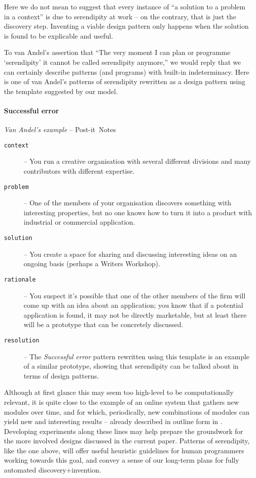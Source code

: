 Here we do not mean to suggest that every instance of ``a solution to a
problem in a context'' is due to serendipity at work -- on the
contrary, that is just the discovery step.  Inventing a viable design pattern
only happens when the solution is found to be explicable and useful.

To van Andel's assertion that ``The very moment I can plan or
programme `serendipity' it cannot be called serendipity anymore,'' we
would reply that we can certainly describe patterns (and programs)
with built-in indeterminacy.  Here is one of van Andel's patterns of
serendipity rewritten as a design pattern using the template suggested
by our model.

\begin{mdframed}
\vspace{-.35cm}
\paragraph{Successful error}
\emph{Van Andel's example} -- Post-it\texttrademark\ Notes\\[.05cm]
\begin{description}
\item[{\tt context}] -- You run a creative organisation with several different divisions and many contributors with different expertise.  
\item[{\tt problem}] -- One of the members of your organisation
  discovers something with interesting properties, but no one
  knows how to turn it into a product with industrial or commercial application.
\item[{\tt solution}] -- You create a space for sharing and discussing
  interesting ideas on an ongoing basis (perhaps a Writers Workshop).
\item[{\tt rationale}] -- You suspect it's possible that one of the
  other members of the firm will come up with an idea about an
  application; you know that if a potential application is found, it
  may not be directly marketable, but at least there will be a
  prototype that can be concretely discussed.
\item[{\tt resolution}] -- The \emph{Successful error} pattern
  rewritten using this template is an example of a similar
  prototype, showing that serendipity can be talked about in
  terms of design patterns.
\end{description}
\end{mdframed}

\bigskip

Although at first glance this may seem too high-level to be
computationally relevant, it is quite close to the example of an
online system that gathers new modules over time, and for which,
periodically, new combinations of modules can yield new and
interesting results -- already described in outline form in
\cite{pease2013discussion}.  
%
Developing experiments along these lines may help prepare the
groundwork for the more involved designs discussed in the current
paper.
%
Patterns of serendipity, like the one above, will offer useful
heuristic guidelines for human programmers working towards this goal,
and convey a sense of our long-term plans for fully automated
discovery+invention.

